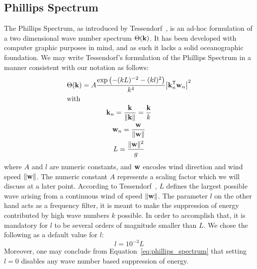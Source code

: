 \subsection{Phillips Spectrum}
\label{sec:phillips_spectrum}
%
The Phillips Spectrum, as introduced by Tessendorf~\cite{course:simulatingocean}, is an ad-hoc formulation of a two dimensional wave number spectrum $\Theta(\mathbf{k})$. It has been developed with computer graphic purposes in mind, and as such it lacks a solid oceanographic foundation. We may write Tessendorf's formulation of the Phillips Spectrum in a manner consistent with our notation as follows:
%
\begin{subequations}
\begin{gather}
\label{eq:phillips_spectrum}
 \Theta(\mvec{k}) = A\frac{\exp\left(-(kL)^{-2}-(kl)^2\right)}{k^4}\abs*{\transpose{\mvec{k}_n}\mvec{w}_n}^2\\
\intertext{with}
\mvec{k}_n = \frac{\mvec{k}}{\norm{\mvec{k}}} = \frac{\mvec{k}}{k}\\
\mvec{w}_n = \frac{\mvec{w}}{\norm{\mvec{w}}}\\
L = \frac{\norm{\mvec{w}}^2}{g}
\end{gather}
\end{subequations}
%
where $A$ and $l$ are numeric constants, and $\mathbf{w}$ encodes wind 
direction and wind speed $\lVert\mathbf{w}\rVert$. The numeric constant $A$ represents 
a scaling factor which we will discuss at a later point.  According to 
Tessendorf~\cite{course:simulatingocean}, $L$ defines the largest possible wave
arising from a continuous wind of speed $\lVert\mathbf{w}\rVert$. The parameter $l$ on 
the other hand acts as a frequency filter, it is meant to make the suppression 
of energy contributed by high wave numbers $k$ possible. In order to accomplish 
that, it is mandatory for $l$ to be several orders of magnitude smaller than 
$L$. We chose the following as a default value for $l$:
\begin{equation}
 l = 10^{-3}L
\end{equation}
Moreover, one may conclude from Equation~\ref{eq:phillips_spectrum} that setting 
$l = 0$ disables any wave number based suppression of energy.\\

